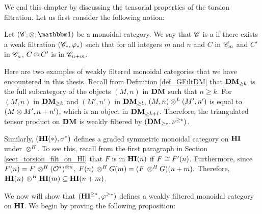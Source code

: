 We end this chapter by discussing the tensorial properties of the 
torsion filtration. Let us first consider the following notion:

\begin{defn}\label{def_graded_tensor}
  Let $(\Cat{C}, \tensor, \Unit)$ be a monoidal category. We say that
  $\Cat{C}$ is a  if there
  exists a weak filtration $(\Cat{C}_*, \phi_*)$ such that for all
  integers $m$ and $n$ and $C$ in $\Cat{C}_m$ and $C'$ in $\Cat{C}_n$,
  $C \tensor C'$ is in $\Cat{C}_{n+m}$.
\end{defn}

\begin{ex}
Here are two examples of weakly filtered monoidal categories
that we have encountered in this thesis. Recall from Definition 
\ref{def_GFiltDM} that $\GFiltDM[k]{\DM}$ is the full subcategory
of the objects $(M, n)$ in $\DM$ such that $n \geq k$. For $(M, n)$
in $\GFiltDM[k]{\DM}$ and $(M', n')$ in $\GFiltDM[l]{\DM}$, $(M, n) \tDM (M', n')$
is equal to $(M \tensor M', n + n')$, which is an object in $\GFiltDM[k + l]{\DM}$.
Therefore, the triangulated tensor product on $\DM$ is weakly filtered
by $(\GFiltDM[*]{\DM}, \sgDM{*})$.

Similarly, $(\HI(*), \sgHI{*})$ defines a graded symmetric 
monoidal category on $\HI$ under $\tHI$. To see this, recall
from the first paragraph in Section \ref{sect_torsion_filt_on_HI}
that $F$ is in $\LHI[n]{\HI}$ if $F \cong \LHI[n]{F'}$. 
Furthermore, since $\LHI[n]{F} = F \tHI (\Ox)^{\tensor n}$, 
$\LHI[n]{F} \tHI \LHI[m]{G} = \LHI[n + m]{(F \tHI G)}.$ Therefore, 
$\LHI[n]{\HI} \tHI \LHI[m]{\HI} \subseteq \LHI[n + m]{\HI}$.
\end{ex}

We now will show that $(\THI{*}, \tgHI{*})$ defines a weakly filtered 
monoidal category on $\HI$. We begin by proving the following
proposition:

